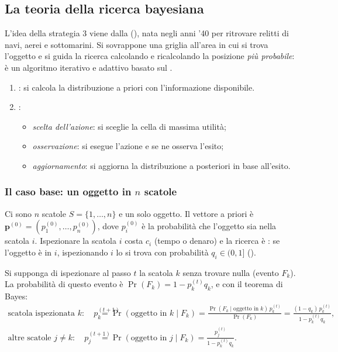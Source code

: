 \subsection{La teoria della ricerca bayesiana}

L'idea della strategia 3 viene dalla 
(), nata negli anni '40 per ritrovare relitti di navi, aerei e
sottomarini. Si sovrappone una griglia all'area in cui si trova l'oggetto e si guida la
ricerca calcolando e ricalcolando la posizione \emph{più probabile}: è un algoritmo
iterativo e adattivo basato sul .

\begin{definizione}
\begin{enumerate}
  \item {}: si calcola la distribuzione a priori con l'informazione disponibile.
  \item {}:
  \begin{itemize}
    \item \emph{scelta dell'azione}: si sceglie la cella di massima utilità;
    \item \emph{osservazione}: si esegue l'azione e se ne osserva l'esito;
    \item \emph{aggiornamento}: si aggiorna la distribuzione a posteriori in base all'esito.
  \end{itemize}
\end{enumerate}
\end{definizione}

\subsubsection*{Il caso base: un oggetto in $n$ scatole}

Ci sono $n$ scatole $S = \{1,\dots,n\}$ e un solo oggetto. Il vettore a priori è
$\mathbf{p}^{(0)} = (p_1^{(0)},\dots,p_n^{(0)})$, dove $p_i^{(0)}$ è la probabilità che
l'oggetto sia nella scatola $i$. Ispezionare la scatola $i$ costa $c_i$ (tempo o denaro) e
la ricerca è : se l'oggetto è in $i$, ispezionando $i$ lo si trova con
probabilità $q_i \in (0,1]$ ().

Si supponga di ispezionare al passo $t$ la scatola $k$ senza trovare nulla (evento $F_k$).
La probabilità di questo evento è $\Pr(F_k) = 1 - p_k^{(t)} q_k$, e con il teorema di
Bayes:
\begin{align*}
  \text{scatola ispezionata } k:\quad
  p_k^{(t+1)} &= \Pr(\text{oggetto in } k \mid F_k)
               = \frac{\Pr(F_k \mid \text{oggetto in } k)\, p_k^{(t)}}{\Pr(F_k)}
               = \frac{(1-q_k)\, p_k^{(t)}}{1 - p_k^{(t)} q_k},\\[2pt]
  \text{altre scatole } j \neq k:\quad
  p_j^{(t+1)} &= \Pr(\text{oggetto in } j \mid F_k)
               = \frac{p_j^{(t)}}{1 - p_k^{(t)} q_k}.
\end{align*}

